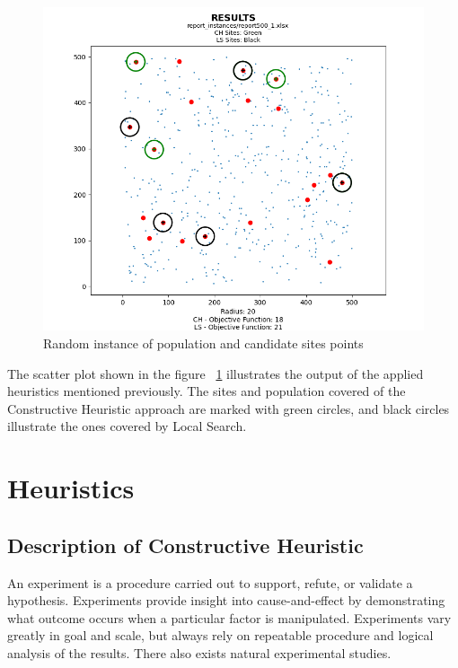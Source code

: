 \documentclass[11pt, a4paper]{article}
\begin{document}
\begin{figure}[h]
	\centering
	\includegraphics[scale=0.8]{example_instance_output.png}
	\caption{Random instance of population and candidate sites points}
	\label{fig:example_instance_output}
\end{figure}

The scatter plot shown in the figure ~\ref{fig:example_instance_output} illustrates the output of the applied heuristics mentioned previously. The sites and population covered of the Constructive Heuristic approach are marked with green circles, and black circles illustrate the ones covered by Local Search. 

\section{Heuristics}\label{sec:exp}

\subsection{Description of Constructive Heuristic}
An experiment is a procedure carried out to support, refute, or validate a hypothesis. Experiments provide insight into cause-and-effect by demonstrating what outcome occurs when a particular factor is manipulated. Experiments vary greatly in goal and scale, but always rely on repeatable procedure and logical analysis of the results. There also exists natural experimental studies.
\end{document}
